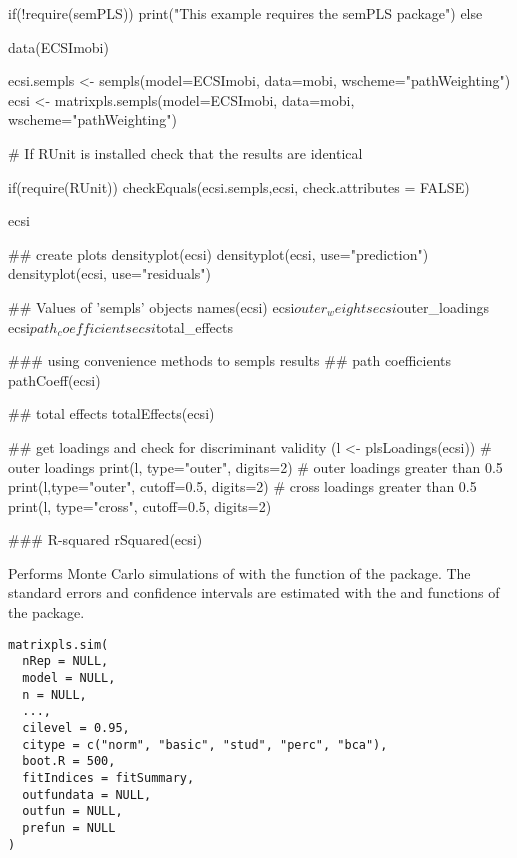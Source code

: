\documentclass[a4paper]{book}
\begin{document}
\begin{Examples}
\begin{ExampleCode}
if(!require(semPLS)){
    print("This example requires the semPLS package")
} else{
data(ECSImobi)

ecsi.sempls <- sempls(model=ECSImobi, data=mobi, wscheme="pathWeighting")
ecsi <- matrixpls.sempls(model=ECSImobi, data=mobi, wscheme="pathWeighting")

# If RUnit is installed check that the results are identical

if(require(RUnit)){
  checkEquals(ecsi.sempls,ecsi, check.attributes = FALSE)
}

ecsi

## create plots
densityplot(ecsi)
densityplot(ecsi, use="prediction")
densityplot(ecsi, use="residuals")

## Values of 'sempls' objects
names(ecsi)
ecsi$outer_weights
ecsi$outer_loadings
ecsi$path_coefficients
ecsi$total_effects


### using convenience methods to sempls results
## path coefficients
pathCoeff(ecsi)

## total effects
totalEffects(ecsi)

## get loadings and check for discriminant validity
(l <- plsLoadings(ecsi))
# outer loadings
print(l, type="outer", digits=2)
# outer loadings greater than 0.5
print(l,type="outer", cutoff=0.5, digits=2)
# cross loadings greater than 0.5
print(l, type="cross", cutoff=0.5, digits=2)


### R-squared
rSquared(ecsi)

}
\end{ExampleCode}
\end{Examples}
%
\begin{Description}\relax
Performs Monte Carlo simulations of  with the  function of the  package.
The standard errors and confidence intervals are estimated with the  and  functions
of the  package.
\end{Description}
%
\begin{Usage}
\begin{verbatim}
matrixpls.sim(
  nRep = NULL,
  model = NULL,
  n = NULL,
  ...,
  cilevel = 0.95,
  citype = c("norm", "basic", "stud", "perc", "bca"),
  boot.R = 500,
  fitIndices = fitSummary,
  outfundata = NULL,
  outfun = NULL,
  prefun = NULL
)
\end{verbatim}
\end{Usage}
\end{document}
